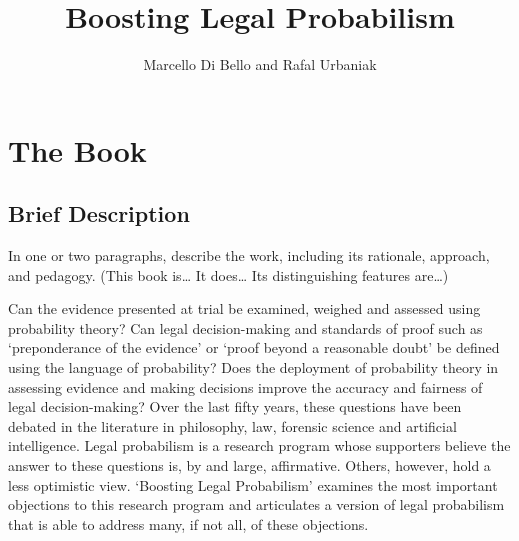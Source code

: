 \documentclass[10pt,dvipsnames,enabledeprecatedfontcommands]{scrartcl}
\title{Boosting Legal Probabilism}
\author{Marcello Di Bello and Rafal Urbaniak}
\date{}
\begin{document}
\maketitle

\section{The Book}\label{the-book}

\subsection{Brief Description}\label{brief-description}

\footnotesize In one or two paragraphs, describe the work, including its
rationale, approach, and pedagogy. (This book is\ldots{} It does\ldots{}
Its distinguishing features are\ldots{})

\normalsize

Can the evidence presented at trial be examined, weighed and assessed
using probability theory? Can legal decision-making and standards of
proof such as `preponderance of the evidence' or `proof beyond a
reasonable doubt' be defined using the language of probability? Does the
deployment of probability theory in assessing evidence and making
decisions improve the accuracy and fairness of legal decision-making?
Over the last fifty years, these questions have been debated in the
literature in philosophy, law, forensic science and artificial
intelligence. Legal probabilism is a research program whose supporters
believe the answer to these questions is, by and large, affirmative.
Others, however, hold a less optimistic view. `Boosting Legal
Probabilism' examines the most important objections to this research
program and articulates a version of legal probabilism that is able to
address many, if not all, of these objections.
\end{document}
